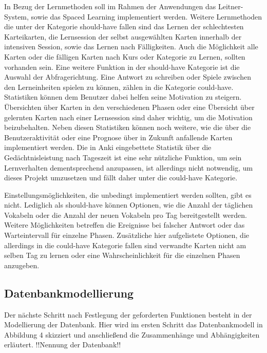 In Bezug der Lernmethoden soll im Rahmen der Anwendungen das Leitner-System, sowie das Spaced Learning implementiert werden. Weitere Lernmethoden die unter der Kategorie should-have fallen sind das Lernen der schlechtesten Karteikarten, die Lernsession der selbst ausgewählten Karten innerhalb der intensiven Session, sowie das Lernen nach Fälligkeiten. Auch die Möglichkeit alle Karten oder die fälligen Karten nach Kurs oder Kategorie zu Lernen, sollten vorhanden sein. Eine weitere Funktion in der should-have Kategorie ist die Auswahl der Abfragerichtung. Eine Antwort zu schreiben oder Spiele zwischen den Lerneinheiten spielen zu können, zählen in die Kategorie could-have. \\

Statistiken können dem Benutzer dabei helfen seine Motivation zu steigern. Übersichten über Karten in den verschiedenen Phasen oder eine Übersicht über gelernten Karten nach einer Lernsession sind daher wichtig, um die Motivation beizubehalten. Neben diesen Statistiken können noch weitere, wie die über die Benutzeraktivität oder eine Prognose über in Zukunft anfallende Karten implementiert werden. Die in Anki eingebettete Statistik über die Gedächtnisleistung nach Tageszeit ist eine sehr nützliche Funktion, um sein Lernverhalten dementsprechend anzupassen, ist allerdings nicht notwendig, um dieses Projekt umzusetzen und fällt daher unter die could-have Kategorie.

Einstellungsmöglichkeiten, die unbedingt implementiert werden sollten, gibt es nicht. Lediglich als should-have können Optionen, wie die Anzahl der täglichen Vokabeln oder die Anzahl der neuen Vokabeln pro Tag bereitgestellt werden. Weitere Möglichkeiten betreffen die Ereignisse bei falscher Antwort oder das Warteintervall für einzelne Phasen. Zusätzliche hier aufgelistete Optionen, die allerdings in die could-have Kategorie fallen sind verwandte Karten nicht am selben Tag zu lernen oder eine Wahrscheinlichkeit für die einzelnen Phasen anzugeben. 




\subsection{Datenbankmodellierung}

Der nächste Schritt nach Festlegung der geforderten Funktionen besteht in der Modellierung der Datenbank. Hier wird im ersten Schritt das Datenbankmodell in Abbildung 4 skizziert und anschließend die Zusammenhänge und Abhängigkeiten erläutert. !!Nennung der Datenbank!!

